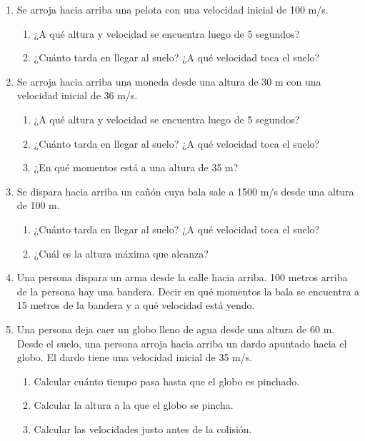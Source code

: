 \begin{enumerate}
\item Se arroja hacia arriba una pelota con una velocidad inicial de 100 m/s. 
\begin{enumerate}
    \item ¿A qué altura y velocidad se encuentra luego de 5 segundos? %

    \item ¿Cuánto tarda en llegar al suelo?  ¿A qué velocidad toca el suelo? %
\end{enumerate}

\item Se arroja hacia arriba una moneda desde una altura de 30 m con una velocidad inicial de 36 m/s. 
\begin{enumerate}
    \item ¿A qué altura y velocidad se encuentra luego de 5 segundos?

    \item ¿Cuánto tarda en llegar al suelo?  ¿A qué velocidad toca el suelo?

    \item ¿En qué momentos está a una altura de 35 m?
\end{enumerate}

\item Se dispara hacia arriba un cañón cuya bala sale a 1500 m/s desde una altura de 100 m. 
\begin{enumerate}
    \item ¿Cuánto tarda en llegar al suelo?  ¿A qué velocidad toca el suelo? %

    \item ¿Cuál es la altura máxima que alcanza?
\end{enumerate}

\item Una persona dispara un arma desde la calle hacia arriba. 100 metros arriba de la persona hay una bandera. Decir en qué momentos la bala se encuentra a 15 metros de la bandera y a qué velocidad está yendo.

\item Una persona deja caer un globo lleno de agua desde una altura de 60 m. Desde
el suelo, una persona arroja hacia arriba
un dardo apuntado hacia el globo. El dardo tiene una velocidad inicial de 35 m/s.
\begin{enumerate}
    \item Calcular cuánto tiempo pasa hasta que el
    globo es pinchado.
    \item Calcular la altura a la que el globo se pincha.
    \item Calcular las velocidades justo antes de la colisión.
\end{enumerate}


\end{enumerate}
